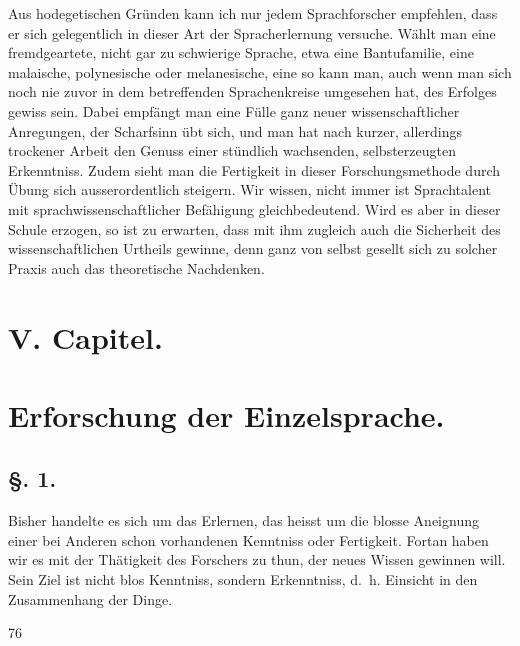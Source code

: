 Aus hodegetischen Gründen kann ich nur jedem Sprachforscher empfehlen, dass er sich gelegentlich in dieser Art der Spracherlernung versuche. Wählt man eine fremdgeartete, nicht gar zu schwierige Sprache, etwa eine  Bantufamilie, eine malaische, polynesische oder melanesische, eine  so kann man, auch wenn man sich noch nie zuvor in dem betreffenden Sprachenkreise umgesehen hat, des Erfolges gewiss sein. Dabei empfängt man eine Fülle ganz neuer wissenschaftlicher Anregungen, der Scharfsinn übt sich, und man hat nach kurzer, allerdings trockener Arbeit den Genuss einer stündlich wachsenden, selbsterzeugten Erkenntniss. Zudem sieht man die Fertigkeit in dieser Forschungsmethode durch Übung sich ausserordentlich steigern. Wir wissen, nicht immer ist Sprachtalent mit sprachwissenschaftlicher Befähigung gleichbedeutend. Wird es aber in dieser Schule erzogen, so ist zu erwarten, dass mit ihm zugleich auch die Sicherheit des wissenschaftlichen Urtheils gewinne, denn ganz von selbst gesellt sich zu solcher Praxis auch das theoretische Nachdenken.

\section*{V. Capitel.}
\section*{Erforschung der Einzelsprache.}
\subsection*{§. 1.}\label{II.V.1}

Bisher handelte es sich um das Erlernen, das heisst um die blosse Aneignung einer bei Anderen schon vorhandenen Kenntniss oder Fertigkeit. Fortan haben wir es mit der Thätigkeit des Forschers zu thun, der neues Wissen gewinnen will. Sein Ziel ist nicht blos Kenntniss, sondern Erkenntniss, d.~h. Einsicht in den Zusammenhang der Dinge.

\label{fp.78}

 {\textbar}{\textbar}76{\textbar}{\textbar}\label{sp.76} 


